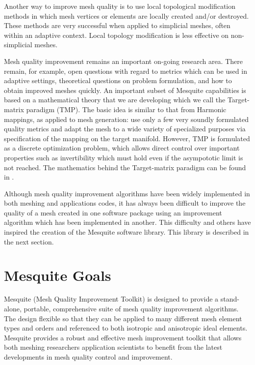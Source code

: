 Another way to improve mesh quality is to use local topological modification methods in which mesh vertices or elements are locally created and/or destroyed. These methods are very successful when applied to simplicial meshes, often within an adaptive context.  Local topology modification is less effective on non-simplicial meshes. \newline

Mesh quality improvement remains an important on-going research area. 
There remain, for example, open questions with regard to metrics which 
can be used in adaptive settings, theoretical questions on problem 
formulation, and how to obtain improved meshes quickly. An important 
subset of Mesquite capabilities is based on a mathematical theory that we
are developing which we call the Target-matrix paradigm (TMP).  The
basic idea is similar to that from Harmonic mappings, as applied to mesh
generation: use only a few very soundly formulated quality metrics and 
adapt the mesh to a wide variety of specialized purposes via specification 
of the mapping on the target manifold. However, TMP is formulated as a 
discrete optimization problem, which allows direct control over important
properties such as invertibility which must hold even if the asympototic limit
is not reached. The mathematics behind the Target-matrix 
paradigm can be found in \cite{formal,local2dmetrics,convexity,analysis2D,labelinv,labelinv-imr,tgtcons}. \newline

Although mesh quality improvement algorithms have been widely implemented 
in both meshing and applications codes, it has always been difficult to 
improve the quality of a mesh created in one software package using an 
improvement algorithm which has been implemented in another.  This difficulty
and others have inspired the creation of the Mesquite software library. 
This library is described in the next section. \newline


\section{Mesquite Goals}
Mesquite (Mesh Quality Improvement Toolkit) is designed to provide a
stand-alone, portable, comprehensive suite of mesh quality improvement
algorithms.  The design flexible so that they can be applied to many
different mesh element types and orders and referenced to both
isotropic and anisotropic ideal elements.  Mesquite provides a robust
and effective mesh improvement toolkit that allows both meshing
researchers application scientists to benefit from the latest
developments in mesh quality control and improvement. \newline


